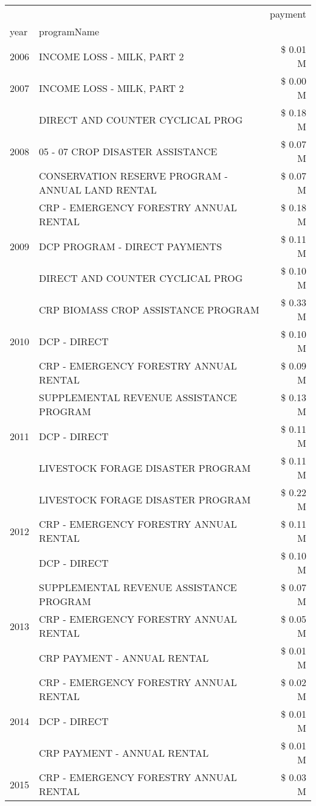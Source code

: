 \begin{tabular}{llr}
\toprule
 &  & payment \\
year & programName &  \\
\midrule
2006 & INCOME LOSS - MILK, PART 2 & \$ 0.01 M \\
\cline{1-3}
2007 & INCOME LOSS - MILK, PART 2 & \$ 0.00 M \\
\cline{1-3}
\multirow[t]{3}{*}{2008} & DIRECT AND COUNTER CYCLICAL PROG & \$ 0.18 M \\
 & 05 - 07 CROP DISASTER ASSISTANCE & \$ 0.07 M \\
 & CONSERVATION RESERVE PROGRAM - ANNUAL LAND RENTAL & \$ 0.07 M \\
\cline{1-3}
\multirow[t]{3}{*}{2009} & CRP - EMERGENCY FORESTRY ANNUAL RENTAL & \$ 0.18 M \\
 & DCP PROGRAM - DIRECT PAYMENTS & \$ 0.11 M \\
 & DIRECT AND COUNTER CYCLICAL PROG & \$ 0.10 M \\
\cline{1-3}
\multirow[t]{3}{*}{2010} & CRP BIOMASS CROP ASSISTANCE PROGRAM & \$ 0.33 M \\
 & DCP - DIRECT & \$ 0.10 M \\
 & CRP - EMERGENCY FORESTRY ANNUAL RENTAL & \$ 0.09 M \\
\cline{1-3}
\multirow[t]{3}{*}{2011} & SUPPLEMENTAL REVENUE ASSISTANCE PROGRAM & \$ 0.13 M \\
 & DCP - DIRECT & \$ 0.11 M \\
 & LIVESTOCK FORAGE DISASTER PROGRAM & \$ 0.11 M \\
\cline{1-3}
\multirow[t]{3}{*}{2012} & LIVESTOCK FORAGE DISASTER PROGRAM & \$ 0.22 M \\
 & CRP - EMERGENCY FORESTRY ANNUAL RENTAL & \$ 0.11 M \\
 & DCP - DIRECT & \$ 0.10 M \\
\cline{1-3}
\multirow[t]{3}{*}{2013} & SUPPLEMENTAL REVENUE ASSISTANCE PROGRAM & \$ 0.07 M \\
 & CRP - EMERGENCY FORESTRY ANNUAL RENTAL & \$ 0.05 M \\
 & CRP PAYMENT - ANNUAL RENTAL & \$ 0.01 M \\
\cline{1-3}
\multirow[t]{3}{*}{2014} & CRP - EMERGENCY FORESTRY ANNUAL RENTAL & \$ 0.02 M \\
 & DCP - DIRECT & \$ 0.01 M \\
 & CRP PAYMENT - ANNUAL RENTAL & \$ 0.01 M \\
\cline{1-3}
\multirow[t]{3}{*}{2015} & CRP - EMERGENCY FORESTRY ANNUAL RENTAL & \$ 0.03 M \\

\end{tabular}
